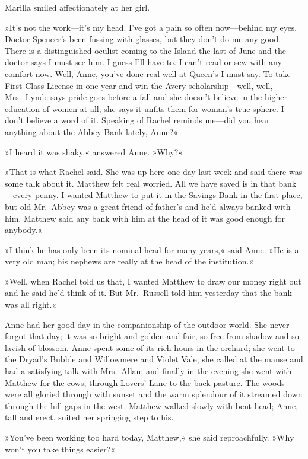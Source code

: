Marilla smiled affectionately at her girl.

»It's not the work—it's my head. I've got a pain so often now—behind my eyes. Doctor Spencer's been fussing with glasses, but they don't do me any good. There is a distinguished oculist coming to the Island the last of June and the doctor says I must see him. I guess I'll have to. I can't read or sew with any comfort now. Well, Anne, you've done real well at Queen's I must say. To take First Class License in one year and win the Avery scholarship—well, well, Mrs.~Lynde says pride goes before a fall and she doesn't believe in the higher education of women at all; she says it unfits them for woman's true sphere. I don't believe a word of it. Speaking of Rachel reminds me—did you hear anything about the Abbey Bank lately, Anne?«

»I heard it was shaky,« answered Anne. »Why?«

»That is what Rachel said. She was up here one day last week and said there was some talk about it. Matthew felt real worried. All we have saved is in that bank—every penny. I wanted Matthew to put it in the Savings Bank in the first place, but old Mr.~Abbey was a great friend of father's and he'd always banked with him. Matthew said any bank with him at the head of it was good enough for anybody.«

»I think he has only been its nominal head for many years,« said Anne. »He is a very old man; his nephews are really at the head of the institution.«

»Well, when Rachel told us that, I wanted Matthew to draw our money right out and he said he'd think of it. But Mr.~Russell told him yesterday that the bank was all right.«

Anne had her good day in the companionship of the outdoor world. She never forgot that day; it was so bright and golden and fair, so free from shadow and so lavish of blossom. Anne spent some of its rich hours in the orchard; she went to the Dryad's Bubble and Willowmere and Violet Vale; she called at the manse and had a satisfying talk with Mrs.~Allan; and finally in the evening she went with Matthew for the cows, through Lovers' Lane to the back pasture. The woods were all gloried through with sunset and the warm splendour of it streamed down through the hill gaps in the west. Matthew walked slowly with bent head; Anne, tall and erect, suited her springing step to his.

»You've been working too hard today, Matthew,« she said reproachfully. »Why won't you take things easier?«

